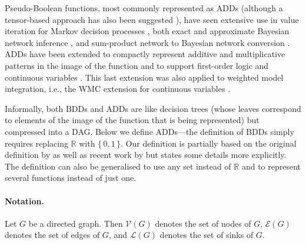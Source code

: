 Pseudo-Boolean functions, most commonly represented as ADDs (although a
tensor-based approach has also been suggested
\citep{DBLP:journals/corr/abs-1908-04381,DBLP:conf/cp/DudekPV20}), have seen
extensive use in value iteration for Markov decision processes
\citep{DBLP:conf/uai/HoeySHB99}, both exact and approximate Bayesian network
inference \citep{DBLP:conf/ijcai/ChaviraD07,DBLP:conf/uai/GogateD11}, and
sum-product network to Bayesian network conversion
\citep{DBLP:conf/icml/ZhaoMP15}. ADDs have been extended to compactly represent
additive and multiplicative patterns in the image of the function
\citep{DBLP:conf/ijcai/SannerM05} and to support first-order logic
\citep{DBLP:journals/ai/SannerB09} and continuous variables
\citep{DBLP:conf/uai/SannerDB11}. This last extension was also applied to
weighted model integration, i.e., the WMC extension for continuous variables
\citep{DBLP:conf/ijcai/BellePB15,DBLP:conf/ijcai/KolbMSBK18}.

Informally, both BDDs and ADDs are like decision trees (whose leaves correspond
to elements of the image of the function that is being represented) but
compressed into a DAG\@. Below we define ADDs---the definition of BDDs simply
requires replacing $\mathbb{R}$ with $\{\, 0, 1 \,\}$. Our definition is
partially based on the original definition by
\citet{DBLP:journals/fmsd/BaharFGHMPS97} as well as recent work by
\citet{DBLP:conf/cp/DudekPV20} but states some details more explicitly. The
definition can also be generalised to use any set instead of $\mathbb{R}$ and to
represent several functions instead of just one.

\paragraph*{Notation.}
Let $G$ be a directed graph. Then $\mathcal{V}(G)$ denotes the set of nodes of
$G$, $\mathcal{E}(G)$ denotes the set of edges of $G$, and $\mathcal{L}(G)$
denotes the set of sinks of $G$.

